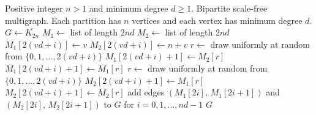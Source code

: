 
\begin{algorithmic}[1]
\Require Positive integer $n > 1$ and minimum degree $d \geq 1$.
\Ensure Bipartite scale-free multigraph. Each partition has $n$
  vertices and each vertex has minimum degree $d$.
\State $G \gets \overline{K_{2n}}$
\State $M_1 \gets$ list of length $2nd$
\State $M_2 \gets$ list of length $2nd$
    \State $M_1[2(vd+i)] \gets v$
    \State $M_2[2(vd+i)] \gets n + v$
    \State $r \gets$ draw uniformly at random from $\{0, 1, \dots, 2(vd+i)\}$
      \State $M_1[2(vd+i) + 1] \gets M_2[r]$
    \Else
      \State $M_1[2(vd+i) + 1] \gets M_1[r]$
    \EndIf
    \State $r \gets$ draw uniformly at random from $\{0, 1, \dots, 2(vd+i)\}$
      \State $M_2[2(vd+i) + 1] \gets M_1[r]$
    \Else
      \State $M_2[2(vd+i) + 1] \gets M_2[r]$
    \EndIf
  \EndFor
\EndFor
\State add edges $(M_1[2i],\, M_1[2i+1])$ and $(M_2[2i],\, M_2[2i+1])$ to $G$
\State for $i = 0, 1, \dots, nd-1$
\State \Return $G$
\end{algorithmic}
